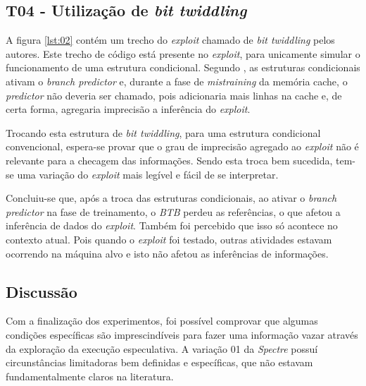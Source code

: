 \documentclass[
	article,			    %
	12pt,				    %
	oneside,			    %
	a4paper,			    %
	chapter=TITLE,		    %
	section=TITLE,		    %
	subsection=TITLE,	    %
	english,			    %
	brazil,				    %
	sumario=tradicional
]{abntex2}
\begin{document}
\begin{comment}
Adicionar uma imagem com as saídas.
Retirar a parte dos benchmarks, pois pode conter erros grotescos, por causa da lei dos grandes números.
\end{comment}

\subsection{T04 - Utilização de \emph{bit twiddling}}
A figura \ref{lst:02} contém um trecho do \emph{exploit} chamado de \emph{bit twiddling} pelos autores. Este trecho de código está presente no \emph{exploit}, para unicamente simular o funcionamento de uma estrutura condicional. Segundo , as estruturas condicionais ativam o \emph{branch predictor} e, durante a fase de \emph{mistraining} da memória cache, o \emph{predictor} não deveria ser chamado, pois adicionaria mais linhas na cache e, de certa forma, agregaria imprecisão a inferência do \emph{exploit}.



Trocando esta estrutura de \emph{bit twiddling}, para uma estrutura condicional convencional, espera-se provar que o grau de imprecisão agregado ao \emph{exploit} não é relevante para a checagem das informações. Sendo esta troca bem sucedida, tem-se uma variação do \emph{exploit} mais legível e fácil de se interpretar.

Concluiu-se que, após a troca das estruturas condicionais, ao ativar o \emph{branch predictor} na fase de treinamento, o \emph{BTB} perdeu as referências, o que afetou a inferência de dados do \emph{exploit}. Também foi percebido que isso só acontece no contexto atual. Pois quando o \emph{exploit} foi testado, outras atividades estavam ocorrendo na máquina alvo e isto não afetou as inferências de informações.

\subsection{Discussão}
Com a finalização dos experimentos, foi possível comprovar que algumas condições específicas são imprescindíveis para fazer uma informação vazar através da exploração da execução especulativa. A variação 01 da \emph{Spectre} possuí circunstâncias limitadoras bem definidas e específicas, que não estavam fundamentalmente claros na literatura.
\end{document}
